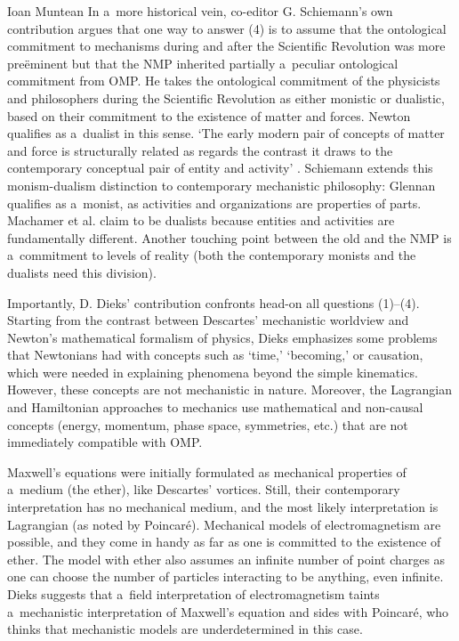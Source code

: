 \begin{recengenv}{Ioan Muntean}
In a~more historical vein, co-editor G. Schiemann's own contribution argues that one way to answer (4) is to assume that the ontological commitment to mechanisms during and after the Scientific Revolution was more preëminent but that the NMP inherited partially a~peculiar ontological commitment from OMP. He takes the ontological commitment of the physicists and philosophers during the Scientific Revolution as either monistic or dualistic, based on their commitment to the existence of matter and forces. Newton qualifies as a~dualist in this sense. ‘The early modern pair of concepts of matter and force is structurally related as regards the contrast it draws to the contemporary conceptual pair of entity and activity'
\parencite*[][p.43]{falkenburg_mechanistic_2019}. %
 Schiemann extends this monism-dualism distinction to contemporary mechanistic philosophy: Glennan qualifies as a~monist, as activities and organizations are properties of parts. Machamer et al. claim to be dualists because entities and activities are fundamentally different. Another touching point between the old and the NMP is a~commitment to levels of reality (both the contemporary monists and the dualists need this division).

Importantly, D. Dieks' contribution confronts head-on all questions (1)–(4). Starting from the contrast between Descartes' mechanistic worldview and Newton's mathematical formalism of physics, Dieks emphasizes some problems that Newtonians had with concepts such as ‘time,' ‘becoming,' or causation, which were needed in explaining phenomena beyond the simple kinematics. However, these concepts are not mechanistic in nature. Moreover, the Lagrangian and Hamiltonian approaches to mechanics use mathematical and non-causal concepts (energy, momentum, phase space, symmetries, etc.) that are not immediately compatible with OMP.

Maxwell's equations were initially formulated as mechanical properties of a~medium (the ether), like Descartes' vortices. Still, their contemporary interpretation has no mechanical medium, and the most likely interpretation is Lagrangian (as noted by Poincaré). Mechanical models of electromagnetism are possible, and they come in handy as far as one is committed to the existence of ether. The model with ether also assumes an infinite number of point charges as one can choose the number of particles interacting to be anything, even infinite. Dieks suggests that a~field interpretation of electromagnetism taints a~mechanistic interpretation of Maxwell's equation and sides with Poincaré, who thinks that mechanistic models are underdetermined in this case.


\end{recengenv}
